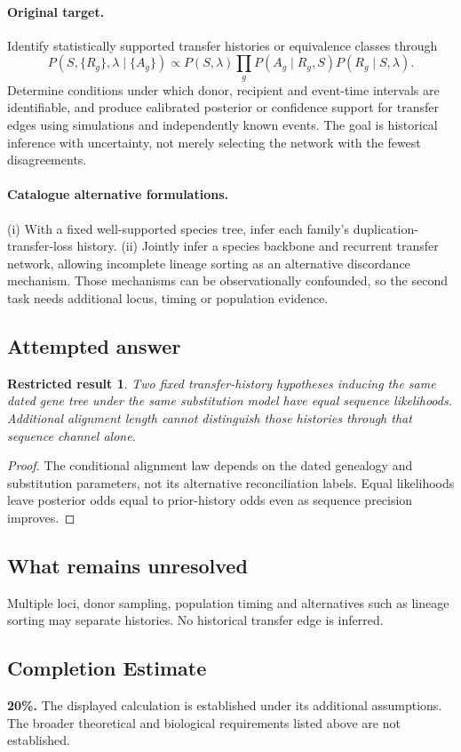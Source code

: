 \documentclass[11pt]{article}
\newtheorem{attemptresult}{Restricted result}[section]
\begin{document}
\paragraph{Original target.}
Identify statistically supported transfer histories or equivalence classes through
\[P(S,\{R_g\},\lambda\mid\{A_g\})\propto P(S,\lambda)\prod_gP(A_g\mid R_g,S)P(R_g\mid S,\lambda).\]
Determine conditions under which donor, recipient and event-time intervals are identifiable, and produce calibrated posterior or confidence support for transfer edges using simulations and independently known events. The goal is historical inference with uncertainty, not merely selecting the network with the fewest disagreements.
\paragraph{Catalogue alternative formulations.}
(i) With a fixed well-supported species tree, infer each family's duplication-transfer-loss history. (ii) Jointly infer a species backbone and recurrent transfer network, allowing incomplete lineage sorting as an alternative discordance mechanism. Those mechanisms can be observationally confounded, so the second task needs additional locus, timing or population evidence.
\subsection{Attempted answer}
\begin{attemptresult}
Two fixed transfer-history hypotheses inducing the same dated gene tree under the same substitution model have equal sequence likelihoods. Additional alignment length cannot distinguish those histories through that sequence channel alone.
\end{attemptresult}
\begin{proof}
The conditional alignment law depends on the dated genealogy and substitution parameters, not its alternative reconciliation labels. Equal likelihoods leave posterior odds equal to prior-history odds even as sequence precision improves.
\end{proof}
\subsection{What remains unresolved}
Multiple loci, donor sampling, population timing and alternatives such as lineage sorting may separate histories. No historical transfer edge is inferred.
\subsection{Completion Estimate}
\textbf{20\%.} The displayed calculation is established under its additional assumptions. The broader theoretical and biological requirements listed above are not established.
\end{document}
